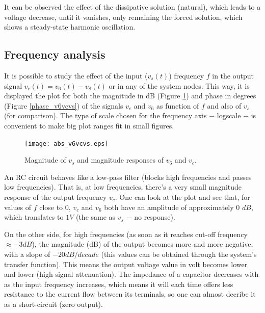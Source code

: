 \vspace{3mm}
\par It can be observed the effect of the dissipative solution (natural), which leads to a voltage decrease, until it vanishes, only remaining the forced solution, which shows a steady-state harmonic oscillation.


\vspace{+5mm}


\vspace{5mm}
\subsection{Frequency analysis} \label{teo:2.6}

\par It is possible to study the effect of the input ($v_s(t)$) frequency $f$ in the output signal $v_c(t)=v_6(t)-v_8(t)$ or in any of the system nodes. This way, it is displayed the plot for both the magnitude in dB (Figure \ref{abs_v6vcvs}) and phase in degrees (Figure \ref{phase_v6vcvs}) of the signals $v_c$ and $v_6$ as function of $f$ and also of $v_s$ (for comparison). The type of scale chosen for the frequency axis $-$ logscale $-$ is convenient to make big plot ranges fit in small figures.

\begin{figure}[h]
     \centering
         \texttt{[image: abs\_v6vcvs.eps]}
         \caption{Magnitude of $v_s$ and magnitude responses of $v_{6}$ and $v_{c}$.}
     \label{abs_v6vcvs}
 \end{figure}
 \vspace{5mm}

\par An RC circuit behaves like a low-pass filter (blocks high frequencies and passes low frequencies). That is, at low frequencies, there's a very small magnitude response of the output frequency $v_c$. One can look at the plot and see that, for values of $f$ close to $0$, $v_c$ and $v_6$ both have an amplitude of approximately $0$ $dB$, which translates to $1V$ (the same as $v_{s}$ $-$ no response).
\par On the other side, for high frequencies (as soon as it reaches cut-off frequency $\approx -3dB$), the magnitude (dB) of the output becomes more and more negative, with a slope of $-20dB/decade$ (this values can be obtained through the system's transfer function). This means the output voltage value in volt becomes lower and lower (high signal attenuation). The impedance of a capacitor decreases with as the input frequency increases, which means it will each time offers less resistance to the current flow between its terminals, so one can almost decribe it as a short-circuit (zero output).

